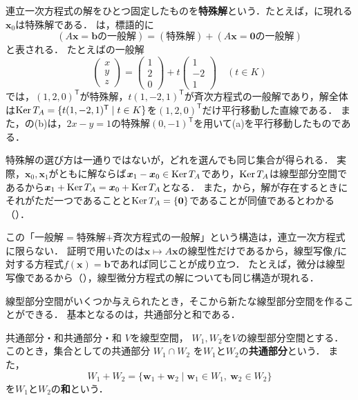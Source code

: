 連立一次方程式の解をひとつ固定したものを\textbf{特殊解}という．たとえば，に現れる$\bm{x}_0$は特殊解である．
は，標語的に
\[
  \boxed{
    (\text{$A\bm{x} = \bm{b}$の一般解})
    = (\text{特殊解})
    + (\text{$A\bm{x} = \bm{0}$の一般解})
  }
\]
と表される．
たとえばの一般解
\[
  \begin{pmatrix} x \\ y \\ z \end{pmatrix}
  = \begin{pmatrix} 1 \\ 2 \\ 0 \end{pmatrix}
  + t \begin{pmatrix} 1 \\ -2 \\ 1 \end{pmatrix}
  \quad (t \in K)
\]
では，$(1, 2, 0)^\mathsf{T}$が特殊解，$t(1, -2, 1)^\mathsf{T}$が斉次方程式の一般解であり，解全体は$\operatorname{Ker} T_A = \{ t(1, -2, 1)^\mathsf{T} \mid t \in K \}$を$(1, 2, 0)^\mathsf{T}$だけ平行移動した直線である．
また，の(b)は，$2x - y = 1$の特殊解$(0, -1)^\mathsf{T}$を用いて(a)を平行移動したものである．

特殊解の選び方は一通りではないが，どれを選んでも同じ集合が得られる．
実際，$\bm{x}_0,\bm{x}_1$がともに解ならば$\bm{x}_1 - \bm{x}_0 \in \operatorname{Ker} T_A$であり，$\operatorname{Ker} T_A$は線型部分空間であるから$\bm{x}_1 + \operatorname{Ker} T_A = \bm{x}_0 + \operatorname{Ker} T_A$となる．
また，から，解が存在するときにそれがただ一つであることと$\operatorname{Ker} T_A = \{\bm{0}\}$であることが同値であるとわかる（）．

この「一般解$=$特殊解$+$斉次方程式の一般解」という構造は，連立一次方程式に限らない．
証明で用いたのは$\bm{x} \mapsto A\bm{x}$の線型性だけであるから，線型写像$f$に対する方程式$f(\bm{x}) = \bm{b}$であれば同じことが成り立つ．
たとえば，微分は線型写像であるから（），線型微分方程式の解についても同じ構造が現れる．

線型部分空間がいくつか与えられたとき，そこから新たな線型部分空間を作ることができる．
基本となるのは，共通部分と和である．

\begin{definition}{共通部分・和}{共通部分・和}
  $V$を線型空間，
  $W_1,W_2$を$V$の線型部分空間とする．
  このとき，集合としての共通部分
  $W_1\cap W_2$
  を$W_1$と$W_2$の\textbf{共通部分}という．
  また，
  \[
  W_1+W_2
  =
  \{
  \bm{w}_1+\bm{w}_2
  \mid
  \bm{w}_1\in W_1,\
  \bm{w}_2\in W_2
  \}
  \]
  を$W_1$と$W_2$の\textbf{和}という．
\end{definition}

